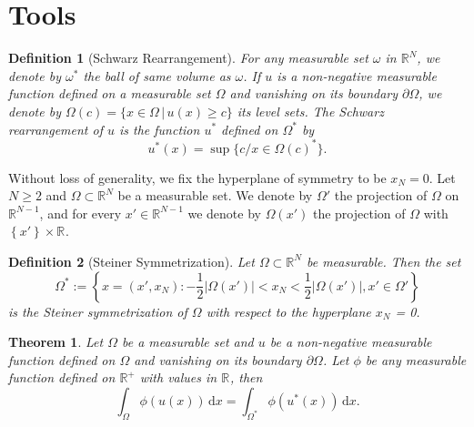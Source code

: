 \documentclass[12pt]{report}
\newtheorem{theorem}{Theorem}[section]
\newtheorem{definition}{Definition}
\numberwithin{definition}{section}
\begin{document}


\break


\section{Tools}

\begin{definition}[Schwarz Rearrangement] \label{schwarz}
  For any measurable set $\omega$ in $\mathbb{R}^{N} $, we denote by $\omega^{*}$ the ball of same volume as $\omega$.
  If $u$ is a non-negative measurable function defined on a measurable set $\Omega$ and vanishing on its boundary $\partial \Omega$,
  we denote by $\Omega(c) = \{ x \in \Omega \,|\, u(x) \geq c \}$ its level sets.
  The Schwarz rearrangement of $u$ is the function $u^{*}$ defined on $\Omega^{*}$ by 
  \[
    u^{*}(x) = \sup\{c / x \in \Omega(c)^{*}\}
  .\] 
  
\end{definition}

Without loss of generality, we fix the hyperplane of symmetry to be $x_{N} = 0$.
Let $N \geq 2$ and $\Omega \subset \mathbb{R}^{N} $ be a measurable set.
We denote by $\Omega'$ the projection of $\Omega$ on $\mathbb{R}^{N-1} $, and for every $x' \in \mathbb{R}^{N-1} $ we denote by $\Omega(x')$ the projection of $\Omega$ with $ \left\{ x' \right\} \times \mathbb{R}^{}  $.

\begin{definition}[Steiner Symmetrization] \label{steiner}
Let $\Omega \subset \mathbb{R}^{N} $ be measurable.
Then the set 
\[
\Omega^{*} := \left\{ x = (x', x_{N}) : - \frac{1}{2} |\Omega(x')| < x_{N} < \frac{1}{2} |\Omega(x')|, x' \in \Omega' \right\} 
\] 
is the Steiner symmetrization of $\Omega$ with respect to the hyperplane $x_{N}$ = 0.
\end{definition}


\begin{theorem} \label {fk1}
 Let $\Omega$ be a measurable set and $u$ be a non-negative measurable function defined on $\Omega$ and vanishing on its boundary $\partial  \Omega$. 
 Let $\phi$ be any measurable function defined on $\mathbb{R}^{+} $ with values in $\mathbb{R}^{} $, then
 \[
   \int_\Omega \! \phi(u(x)) \, \mathrm{d}x = \int_{\Omega^*} \! \phi(u^*(x)) \, \mathrm{d}x  
 .\] 
\end{theorem}
\end{document}
